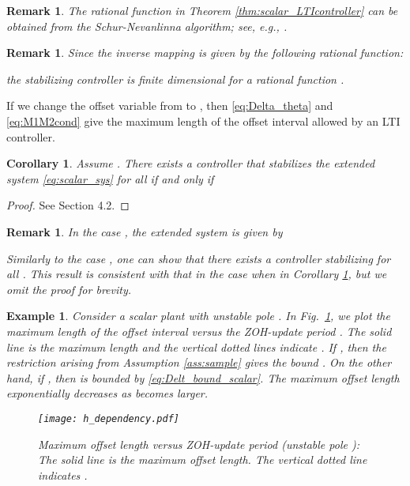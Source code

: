 \documentclass[letterpaper, 12pt, draftcls, onecolumn]{ieeeconf}
\newtheorem{example}[theorem]{Example}
\newtheorem{remark}[theorem]{Remark}
\newtheorem{corollary}[theorem]{Corollary}
\begin{document}
\begin{remark}
	The rational function  in Theorem \ref{thm:scalar_LTIcontroller}
	can be obtained from the Schur-Nevanlinna algorithm; see, e.g., 
	\cite{luxemburg2010, wakaiki2012}.
\end{remark}	

\begin{remark}
	\label{rem:related_work}
	Since the inverse mapping  is given by
	the following rational function:
	
	the stabilizing controller  is finite dimensional for 
	a rational function .
\end{remark}


If we change the offset variable from  to ,
then \eqref{eq:Delta_theta} and \eqref{eq:M1M2cond} give
the maximum 
length of the offset interval  allowed 
by an LTI controller.
\begin{corollary}
	\label{coro:maximum_length}
	Assume .
	There exists a controller that stabilizes 
	the extended system \eqref{eq:scalar_sys}
	for all  if and only if 

\end{corollary}
\begin{proof}
	See Section 4.2.
\end{proof}

\begin{remark}	
	\label{rem:a_equal_zero}	
	In the case , the extended system  is given by
	
	Similarly to the case , one can show that
	there exists a controller stabilizing 
	for all .
	This result is consistent with that in the case when
	 in
	Corollary \ref{coro:maximum_length}, but
	we omit the proof for brevity.
\end{remark}

\begin{example}
	Consider a scalar plant with unstable pole . 
	In Fig.~\ref{fig:h_dependency}, 
	we plot the maximum length of the offset interval 
	versus the ZOH-update period . 
	The solid line is the maximum length 
	and 
	the vertical dotted lines indicate .
	If , then the restriction  arising from Assumption \ref{ass:sample} gives the bound
	.
	On the other hand, if , then
	 is bounded by \eqref{eq:Delt_bound_scalar}.
	The maximum offset length 
	exponentially decreases as  becomes larger. 
	\begin{figure}[bt]
		\centering
		\texttt{[image: h\_dependency.pdf]}
		\caption{Maximum offset length  
			versus ZOH-update period  (unstable pole ):
			The solid line is 
			the maximum offset length. The vertical dotted line
			indicates .}
		\label{fig:h_dependency}
	\end{figure}
\end{example}
\end{document}
